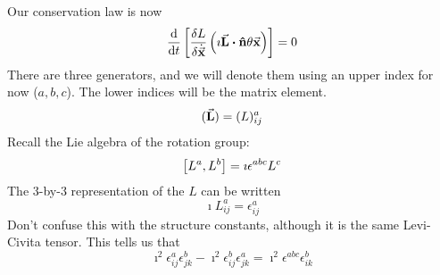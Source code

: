 \documentclass[a4paper,twoside,master.tex]{subfiles}
\begin{document}
\begin{ex}
    Our conservation law is now
    \begin{equation}
        \dv{t}\left[ \fdv{L}{\dot{\va{x}}} \left( \imath\va{ L} \vdot\vu{ n} \theta\va{ x} \right) \right] = 0
    \end{equation}
    There are three generators, and we will denote them using an upper index for now ($ a, b, c $). The lower indices will be the matrix element.
    \begin{equation}
        (\va{ L}) = (L)^a_{ij}
    \end{equation}
    Recall the Lie algebra of the rotation group:
    \begin{equation}
        \comm{L^a}{L^b} = \imath \epsilon^{abc} L^c
    \end{equation}
    The $ 3 $-by-$ 3 $ representation of the $ L $ can be written
    \begin{equation}
        \imath L^a_{ij} = \epsilon^a_{ij}
    \end{equation}
    Don't confuse this with the structure constants, although it is the same Levi-Civita tensor. This tells us that
    \begin{equation}
        \imath^2 \epsilon^a_{ij} \epsilon^b_{jk} - \imath^2 \epsilon^b_{ij} \epsilon^a_{jk} = \imath^2 \epsilon^{abc} \epsilon^b_{ik} 
    \end{equation}
    

\end{ex}
\end{document}
